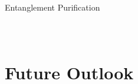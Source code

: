 \begin{frame}{Entanglement Purification}
\begin{columns}
\begin{figure}
	\end{figure}
\end{columns}
\end{frame}

\section{Future Outlook}

